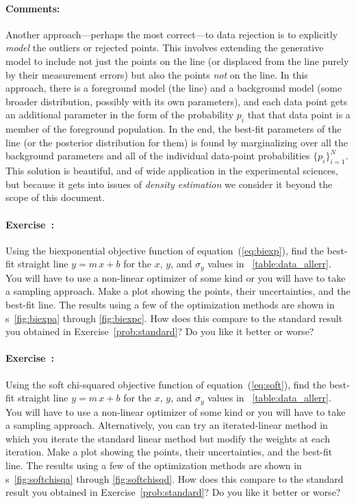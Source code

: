 \documentclass[12pt,twoside]{article}
\newcommand{\documentname}{document}
\newcommand{\equationname}{equation}
\newcommand{\problemname}{Exercise}
\newcommand{\commentsname}{Comments}
\newcounter{problem}
\newenvironment{problem}{\paragraph{\problemname~\theproblem:}\refstepcounter{problem}}{}
\newenvironment{comments}{\paragraph{\commentsname:}}{}
\newcommand{\setofall}[3]{\{{#1}\}_{{#2}}^{{#3}}}
\begin{document}
\begin{comments}
Another approach---perhaps the most correct---to data rejection is to
explicitly \emph{model} the outliers or rejected points.  This
involves extending the generative model to include not just the points
on the line (or displaced from the line purely by their measurement
errors) but also the points \emph{not} on the line.  In this approach,
there is a foreground model (the line) and a background model (some
broader distribution, possibly with its own parameters), and each data
point gets an additional parameter in the form of the probability
$p_i$ that that data point is a member of the foreground population.
In the end, the best-fit parameters of the line (or the posterior
distribution for them) is found by marginalizing over all the
background parameters and all of the individual data-point
probabilities $\setofall{p_i}{i=1}{N}$.  This solution is beautiful,
and of wide application in the experimental sciences, but because it
gets into issues of \emph{density estimation} we consider it beyond
the scope of this \documentname.
\end{comments}

\begin{problem}\label{prob:biexp}
Using the biexponential objective function of
\equationname~(\ref{eq:biexp}), find the best-fit straight line
$y=m\,x+b$ for the $x$, $y$, and $\sigma_y$ values in
\tablename~\ref{table:data_allerr}.  You will have to use a non-linear
optimizer of some kind or you will have to take a sampling approach.
Make a plot showing the points, their uncertainties, and the best-fit
line.  The results using a few of the optimization methods are shown
in \figurename s~\ref{fig:biexpa} through \ref{fig:biexpc}. How does
this compare to the standard result you obtained in
\problemname~\ref{prob:standard}?  Do you like it better or worse?
\end{problem}

\begin{problem}\label{prob:softchisq}
Using the soft chi-squared objective function of
\equationname~(\ref{eq:soft}), find the best-fit straight line
$y=m\,x+b$ for the $x$, $y$, and $\sigma_y$ values in
\tablename~\ref{table:data_allerr}.  You will have to use a non-linear
optimizer of some kind or you will have to take a sampling approach.
Alternatively, you can try an iterated-linear method in which you
iterate the standard linear method but modify the weights at each
iteration.  Make a plot showing the points, their uncertainties, and
the best-fit line.  The results using a few of the optimization
methods are shown in \figurename s~\ref{fig:softchisqa} through
\ref{fig:softchisqd}. How does this compare to the standard result you
obtained in \problemname~\ref{prob:standard}?  Do you like it better
or worse?
\end{problem}
\end{document}
